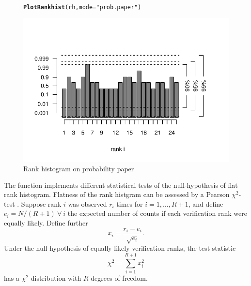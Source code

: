 \documentclass[article]{jss}\usepackage{graphicx, color}
\makeatletter
\def\maxwidth{ %
  \ifdim\Gin@nat@width>\linewidth
    \linewidth
  \else
    \Gin@nat@width
  \fi
}
\newcommand{\hlfunctioncall}[1]{\textcolor[rgb]{0,0.501960784313725,0.752941176470588}{\textbf{#1}}}%
\newcommand{\hlstring}[1]{\textcolor[rgb]{0.650980392156863,0.52156862745098,0}{#1}}%
\newenvironment{kframe}{%
 \def\at@end@of@kframe{}%
 \ifinner\ifhmode%
  \def\at@end@of@kframe{\end{minipage}}%
  \begin{minipage}{\columnwidth}%
 \fi\fi%
 \def\FrameCommand##1{\hskip\@totalleftmargin \hskip-\fboxsep
 \colorbox{shadecolor}{##1}\hskip-\fboxsep
     \hskip-\linewidth \hskip-\@totalleftmargin \hskip\columnwidth}%
 \MakeFramed {\advance\hsize-\width
   \@totalleftmargin\z@ \linewidth\hsize
   \@setminipage}}%
 {\par\unskip\endMakeFramed%
 \at@end@of@kframe}
\newenvironment{knitrout}{}{} %
\makeatother
\begin{document}
\begin{figure}
\begin{center}
%
\begin{knitrout}
\color{fgcolor}\begin{kframe}
\begin{alltt}
\hlfunctioncall{PlotRankhist}(rh, mode=\hlstring{"prob.paper"})
\end{alltt}
\end{kframe}
\includegraphics[width=\maxwidth]{figure/rank-hist-pp} 

\end{knitrout}

%
\end{center}
\caption{Rank histogram on probability paper}
\label{fig:rank-hist-pp}
\end{figure}


The function  implements different statistical tests of the null-hypothesis of flat rank histogram.
Flatness of the rank histgram can be assessed by a Pearson $\chi^2$-test \citep{pearson1900criterion}.
Suppose rank $i$ was observed $r_i$ times for $i=1,\dots,R+1$, and define $e_i=N/(R+1)\ \forall\ i$ the expected number of counts if each verification rank were equally likely.
Define further
\begin{equation}
x_i = \frac{r_i - e_i}{\sqrt{e_i}}.
\end{equation}
%
Under the null-hypothesis of equally likely verification ranks, the test statistic
%
\begin{equation}
\chi^2 = \sum_{i=1}^{R+1} x_i^2
\end{equation}
%
has a $\chi^2$-distribution with $R$ degrees of freedom.
\end{document}
